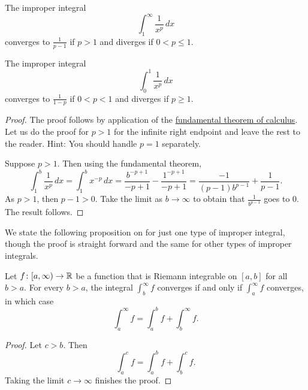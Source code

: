 \begin{prop}%
\label{impropriemann:ptest}
The improper integral
\begin{equation*}
\int_1^\infty \frac{1}{x^p} \,dx
\end{equation*}
converges to $\frac{1}{p-1}$ if $p > 1$ and diverges if $0 < p \leq 1$.

The improper integral
\begin{equation*}
\int_0^1 \frac{1}{x^p} \,dx
\end{equation*}
converges to $\frac{1}{1-p}$ if $0 < p < 1$ and diverges if $p \geq 1$.
\end{prop}

\begin{proof}
The proof follows by application of the
\hyperref[thm:FTCv1]{fundamental theorem of calculus}.
Let us do the proof for $p > 1$ for the infinite right endpoint and
leave the rest to the reader.  Hint: You should handle $p=1$
separately.

Suppose $p > 1$.  Then
using the fundamental theorem,
\begin{equation*}
\int_1^b \frac{1}{x^p} \,dx
=
\int_1^b x^{-p} \,dx
=
\frac{b^{-p+1}}{-p+1}
-
\frac{1^{-p+1}}{-p+1}
=
\frac{-1}{(p-1)b^{p-1}}
+
\frac{1}{p-1} .
\end{equation*}
As $p > 1$, then $p-1 > 0$.  Take the limit as $b \to \infty$
to obtain that $\frac{1}{b^{p-1}}$ goes to 0.  The result follows.
\end{proof}

We state the following proposition on  for just one type
of improper integral, though the proof is straight
forward and the same for other types of improper integrals.

\begin{prop} \label{impropriemann:tail}
Let $f \colon [a,\infty) \to {\mathbb{R}}$ be a function
that is Riemann integrable on $[a,b]$ for all $b > a$.
For every $b > a$, the integral
$\int_b^\infty f$ converges if and only if $\int_a^\infty f$
converges, in which case
\begin{equation*}
\int_a^\infty f
=
\int_a^b f +
\int_b^\infty f .
\end{equation*}
\end{prop}

\begin{proof}
Let $c > b$.  Then
\begin{equation*}
\int_a^c f
=
\int_a^b f +
\int_b^c f .
\end{equation*}
Taking the limit $c \to \infty$ finishes the proof.
\end{proof}

